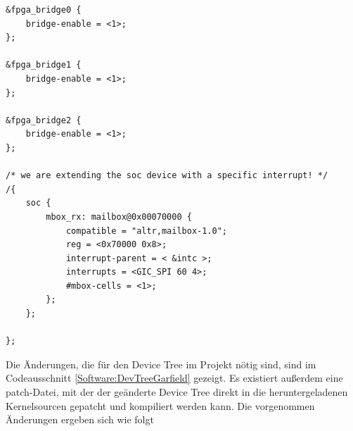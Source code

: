 \begin{lstlisting}[caption={[Änderungen am Device Tree]Notwendige Änderungen am Device Tree}, label=Software:DevTreeGarfield]
&fpga_bridge0 {
	bridge-enable = <1>;
};

&fpga_bridge1 {
	bridge-enable = <1>;
};

&fpga_bridge2 {
	bridge-enable = <1>;
};

/* we are extending the soc device with a specific interrupt! */
/{
	soc {
		mbox_rx: mailbox@0x00070000 {
			compatible = "altr,mailbox-1.0";
			reg = <0x70000 0x8>;
			interrupt-parent = < &intc >;
			interrupts = <GIC_SPI 60 4>;
			#mbox-cells = <1>;
		};
	};

};

\end{lstlisting}
Die Änderungen, die für den Device Tree im \Projectname Projekt nötig sind, sind im Codeausschnitt \ref{Software:DevTreeGarfield} gezeigt. Es existiert außerdem eine patch-Datei, mit der der geänderte Device Tree direkt in die heruntergeladenen Kernelsourcen gepatcht und kompiliert werden kann. Die vorgenommen Änderungen ergeben sich wie folgt
